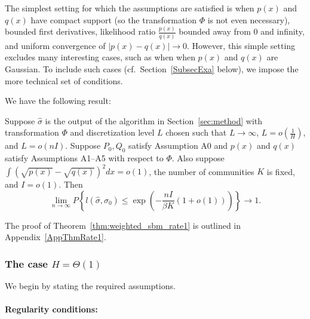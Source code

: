 \documentclass{article}
\begin{document}
The simplest setting for which the assumptions are satisfied is when $p(x)$ and $q(x)$ have compact support (so the transformation $\Phi$ is not even necessary), bounded first derivatives, likelihood ratio $\frac{p(x)}{q(x)}$ bounded away from 0 and infinity, and uniform convergence of $|p(x) - q(x)| \rightarrow 0$. However, this simple setting excludes many interesting cases, such as when when $p(x)$ and $q(x)$ are Gaussian. To include such cases (cf.\ Section~\ref{SubsecExa} below), we impose the more technical set of conditions.

We have the following result:
\begin{theorem}
\label{thm:weighted_sbm_rate1}
Suppose $\hat{\sigma}$ is the output of the algorithm in Section~\ref{sec:method} with transformation $\Phi$ and discretization level $L$ chosen such that $L \rightarrow \infty$, $L = o(\frac{1}{H})$, and $L = o(nI)$. Suppose $P_0, Q_0$ satisfy Assumption A0 and $p(x)$ and $q(x)$ satisfy Assumptions A1--A5 with respect to $\Phi$. Also suppose $\int (\sqrt{p(x)} - \sqrt{q(x)})^2 dx = o(1)$, the number of communities $K$ is fixed, and $I = o(1)$. Then
\[
\lim_{n \rightarrow \infty} P \left\{
     l(\hat{\sigma}, \sigma_0) \leq \exp\left( - \frac{nI}{\beta K} (1 + o(1)) \right)
    \right\} \rightarrow 1.
\]
\end{theorem}
The proof of Theorem~\ref{thm:weighted_sbm_rate1} is outlined in Appendix~\ref{AppThmRate1}. 


\subsubsection{The case $H = \Theta(1)$}

We begin by stating the required assumptions.

\paragraph{\textbf{Regularity conditions:}} 
\end{document}
